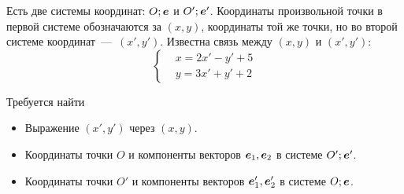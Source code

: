 \documentclass[a4paper,12pt]{article}
\begin{document}
  \begin{problem}[4.5]
    Есть две системы координат: $O; \boldsymbol e$ и $O'; \boldsymbol e'$.
    Координаты произвольной точки в первой системе обозначаются за $(x, y)$, координаты той же точки, но во второй системе координат~---~$(x', y')$.
    Известна связь между $(x, y)$ и $(x', y')$:
    \[
      \left\{
        \begin{aligned}
          &x = 2x' - y' + 5\\
          &y = 3x' + y' + 2
        \end{aligned}
      \right.
    \]
    
    Требуется найти
    \begin{itemize}
      \item Выражение $(x', y')$ через $(x, y)$.
      \item Координаты точки $O$ и компоненты векторов $\boldsymbol e_1, \boldsymbol e_2$ в системе $O'; \boldsymbol e'$.
      \item Координаты точки $O'$ и компоненты векторов $\boldsymbol e_1', \boldsymbol e_2'$ в системе $O; \boldsymbol e$.
    \end{itemize}
  \end{problem}
  
\end{document}
